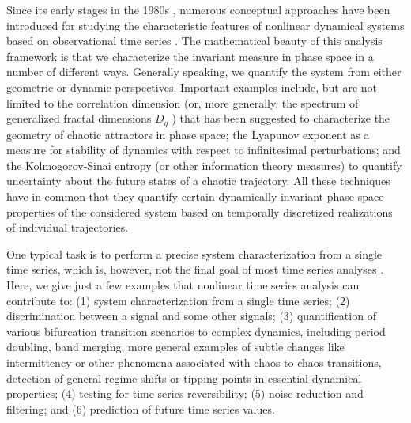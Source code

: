 	Since its early stages in the 1980s \cite{Packard1980}, numerous conceptual approaches have been introduced for studying the characteristic features of nonlinear dynamical systems based on observational time series \cite{abarbanel1993,kantz1997,Sprott2003}. The mathematical beauty of this analysis framework is that we characterize the invariant measure in phase space in a number of different ways. Generally speaking, we quantify the system from either geometric or dynamic perspectives. Important examples include, but are not limited to the correlation dimension (or, more generally, the spectrum of generalized fractal dimensions $D_q$ \cite{Grassberger1983PRL}) that has been suggested to characterize the geometry of chaotic attractors in phase space; the Lyapunov exponent as a measure for stability of dynamics with respect to infinitesimal perturbations; and the Kolmogorov-Sinai entropy (or other information theory measures) to quantify uncertainty about the future states of a chaotic trajectory. All these techniques have in common that they quantify certain dynamically invariant phase space properties of the considered system based on temporally discretized realizations of individual trajectories. 

	One typical task is to perform a precise system characterization from a single time series, which is, however, not the final goal of most time series analyses \cite{Bradley2015c}. Here, we give just a few examples that nonlinear time series analysis can contribute to: (1) system characterization from a single time series; (2) discrimination between a signal and some other signals; (3) quantification of various bifurcation transition scenarios to complex dynamics, including period doubling, band merging, more general examples of subtle changes like intermittency or other phenomena associated with chaos-to-chaos transitions, detection of general regime shifts or tipping points in essential dynamical properties; (4) testing for time series reversibility; (5) noise reduction and filtering; and (6) prediction of future time series values.

